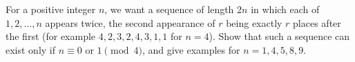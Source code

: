 For a positive integer $n$, we want a sequence of length $2n$ in which each of $1,2,\dots,n$ appears twice, the second appearance of $r$ being exactly $r$ places after the first (for example $4,2,3,2,4,3,1,1$ for $n=4$). Show that such a sequence can exist only if $n\equiv0$ or $1\pmod4$, and give examples for $n=1,4,5,8,9$.
